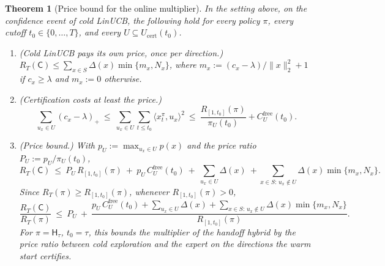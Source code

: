 \documentclass{article}
\newtheorem{theorem}{Theorem}
\theoremstyle{definition}
\theoremstyle{remark}
\theoremstyle{remark}
\newcommand{\Cold}{\mathsf{C}}
\newcommand{\Hyb}{\mathsf{H}}
\begin{document}
\begin{theorem}[Price bound for the online multiplier]
\label{thm:general-price}
In the setting above, on the confidence event of cold LinUCB, the following
hold for every policy $\pi$, every cutoff $t_0\in\{0,\dots,T\}$, and every
$U\subseteq U_{\mathrm{cert}}(t_0)$.
\begin{enumerate}[itemsep=1pt,topsep=1pt,leftmargin=*]
\item[(a)] \emph{(Cold LinUCB pays its own price, once per direction.)}
$R_T(\Cold)\le\sum_{x\in S}\Delta(x)\min\{m_x,N_x\}$, where
$m_x:=(c_x-\lambda)/\|x\|_2^2+1$ if $c_x\ge\lambda$ and $m_x:=0$ otherwise.
\item[(b)] \emph{(Certification costs at least the price.)}
\[
\sum_{u_x\in U}(c_x-\lambda)_+\ \le\ \sum_{u_x\in U}\sum_{t\le t_0}\langle x^\pi_t,u_x\rangle^2
\ \le\ \frac{R_{[1,t_0]}(\pi)}{\pi_U(t_0)}+C^{\mathrm{free}}_U(t_0).
\]
\item[(c)] \emph{(Price bound.)} With $p_U:=\max_{u_x\in U}p(x)$ and the
price ratio $P_U:=p_U/\pi_U(t_0)$,
\[
R_T(\Cold)\ \le\ P_U\,R_{[1,t_0]}(\pi)\ +\ p_U\,C^{\mathrm{free}}_U(t_0)\ +\ \sum_{u_x\in U}\Delta(x)
\ +\sum_{x\in S:\,u_x\notin U}\Delta(x)\min\{m_x,N_x\}.
\]
Since $R_T(\pi)\ge R_{[1,t_0]}(\pi)$, whenever $R_{[1,t_0]}(\pi)>0$,
\begin{equation}
\label{eq:general-price}
\frac{R_T(\Cold)}{R_T(\pi)}\ \le\ P_U\ +\
\frac{p_U\,C^{\mathrm{free}}_U(t_0)+\sum_{u_x\in U}\Delta(x)+\sum_{x\in S:\,u_x\notin U}\Delta(x)\min\{m_x,N_x\}}{R_{[1,t_0]}(\pi)} .
\end{equation}
For $\pi=\Hyb_\tau$, $t_0=\tau$, this bounds the multiplier of the handoff
hybrid by the price ratio between cold exploration and the expert on the
directions the warm start certifies.
\end{enumerate}
\end{theorem}
\end{document}
